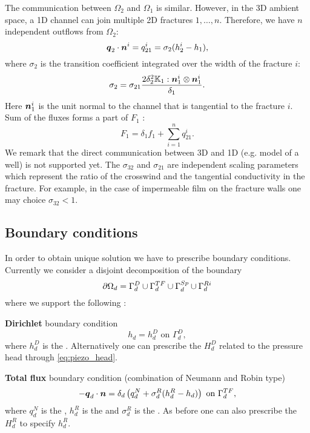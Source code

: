 The communication between $\Omega_2$  and  $\Omega_1$ is similar.  However, in the 3D ambient space,
a 1D channel can join multiple 2D fractures $1,\dots, n$. Therefore, we have $n$
independent outflows from $\Omega_2$:
\begin{equation*}
        \mathbf{\boldsymbol{q}}_2\cdot \mathbf{\boldsymbol{n}}^{i} = q_{21}^{i} =\sigma_{2} (h_2^{i}-h_1),
\end{equation*}
where $\sigma_2$  is the transition coefficient integrated over the width of the fracture $i$:
\[
\label{e:sigma2_law}
  \sigma_2 = \sigma_{21} \frac{2\delta_2^2\tn K_1:{\vc n_1^i}\otimes{\vc n_1^i}}{\delta_1}.
\]
Here $\mathbf{\boldsymbol{n}}_1^i$ is the unit normal to the channel that is tangential to the fracture $i$.
Sum of the fluxes forms a part of $F_1$ :
\begin{equation}
   \label{source_1D}
   F_1 = \delta_1 f_1 + \sum_{i=1}^n q_{21}^{i}. 
\end{equation}
We remark that the direct communication between 3D and 1D (e.g. model of a well) is not supported yet.
The  
{$\sigma_{32}$} \units{}{}{} and
{$\sigma_{21}$} \units{}{}{} are independent scaling parameters which represent 
the ratio of the crosswind and the tangential conductivity in the fracture. For example, in the case of impermeable film
on the fracture walls one may choice $\sigma_{32} < 1$.

\subsection{Boundary conditions}
In order to obtain unique solution we have to prescribe boundary conditions.
Currently we consider a disjoint decomposition of the boundary
\[
    \partial\Omega_d = \Gamma_d^D \cup \Gamma_d^{TF} \cup \Gamma_d^{Sp} \cup \Gamma_d^{Ri}
\]
where we support the following
:

{\bf Dirichlet} boundary condition
\[
    h_d = h_d^D        \text{ on }\Gamma_d^D,
\]
where $h_d^D$  is the  .
Alternatively one can prescribe the 
$H_d^D$  related to the pressure head through \eqref{eq:piezo_head}.

{\bf Total flux} boundary condition (combination of Neumann and Robin type)
\[
    -\mathbf{\boldsymbol{q}}_d \cdot \mathbf{\boldsymbol{n}} = \delta_d\left(q_d^N + \sigma_d^R ( h_d^R - h_d)\right)        \text{ on }\Gamma_d^{TF},
\]
where $q_d^N$  is the ,
$h_d^R$  is the  and
$\sigma_d^R$   
is the .
As before one can also prescribe the 
$H_d^R$ to specify $h_d^R$.

